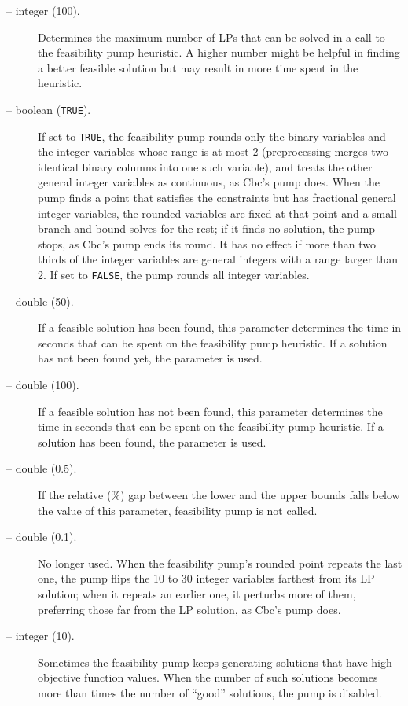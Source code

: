 \begin{description}
\item[ -- integer (100).] 
Determines the maximum number of LPs that can be solved in a call to the
feasibility pump heuristic. A higher number might be helpful in finding a
better feasible solution but may result in more time spent in the heuristic.

\item[ -- boolean ({\tt TRUE}).]
If set to {\tt TRUE}, the feasibility pump rounds only the binary variables
and the integer variables whose range is at most 2 (preprocessing merges two
identical binary columns into one such variable), and treats the other general
integer variables as continuous, as Cbc's pump does. When the pump finds a
point that satisfies the constraints but has fractional general integer
variables, the rounded variables are fixed at that point and a small branch
and bound solves for the rest; if it finds no solution, the pump stops, as
Cbc's pump ends its round. It has no effect if more than two thirds of the
integer variables are general integers with a range larger than 2. If set to
{\tt FALSE}, the pump rounds all integer variables.

\item[ -- double (50).] 
If a feasible solution has been found, this parameter determines the time in
seconds that can be spent on the feasibility pump heuristic. If a solution has
not been found yet, the parameter  is used.

\item[ -- double (100).] 
If a feasible solution has not been found, this parameter determines the time in
seconds that can be spent on the feasibility pump heuristic. If a solution has
been found, the parameter  is used.

\item[ -- double (0.5).] 
If the relative (\%) gap between the lower and the upper bounds falls below the
value of this parameter, feasibility pump is not called.

\item[ -- double (0.1).]
No longer used. When the feasibility pump's rounded point repeats the last
one, the pump flips the 10 to 30 integer variables farthest from its LP
solution; when it repeats an earlier one, it perturbs more of them, preferring
those far from the LP solution, as Cbc's pump does.

\item[ -- integer (10).] 
Sometimes the feasibility pump keeps generating solutions that have high
objective function values. When the number of such solutions becomes more than
 times the number of ``good'' solutions, the pump
is disabled.

\end{description}
